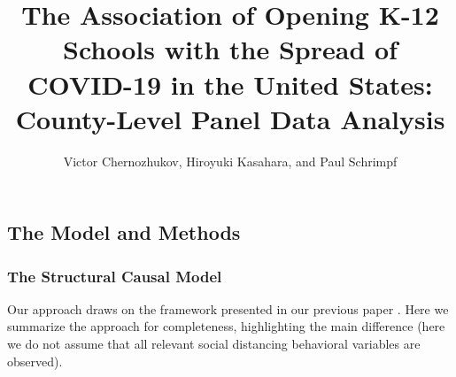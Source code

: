 \documentclass[9pt,twoside,lineno]{pnas-new}
\title{The Association of Opening K-12 Schools with the Spread of COVID-19 in the United States: County-Level Panel Data Analysis}
\author{Victor Chernozhukov, Hiroyuki Kasahara, and Paul Schrimpf}
\theoremstyle{definition}
\begin{document}

\maketitle

 
 

\subsection*{The Model and Methods}\label{sec:causal-mode-SI}

\subsubsection*{The Structural Causal Model}
Our approach draws on the framework presented in our previous paper \cite{chernozhukov2021}. Here we summarize the approach 
for completeness, highlighting the main difference  (here we do not assume that all relevant social distancing behavioral variables are observed).
\end{document}

